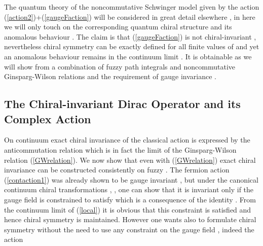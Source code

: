 \documentclass[a4paper,10pt]{article}
\begin{document}
The quantum theory of the noncommutative Schwinger model given by
the action (\ref{action2})+(\ref{gaugeFaction}) will be
considered in great detail elsewhere \cite{badis} , in here we
will only touch on the corresponding quantum chiral structure and
its anomalous behaviour . The claim is that (\ref{gaugeFaction})
is not chiral-invariant , nevertheless chiral symmetry can be
exactly defined for all finite values of \coordHE{} and yet an anomalous
behaviour remains in the continuum limit . It is obtainable as we
will show from a combination of fuzzy path integrals and
noncommutative Ginsparg-Wilson relations and the requirement of
gauge invariance .



\subsection{The Chiral-invariant Dirac Operator \coordHE{} and its Complex Action}
On continuum \coordHE{} exact chiral invariance of the classical
action is expressed by the anticommutation relation
\coordHE{} which is in fact the limit
of the Ginsparg-Wilson relation (\ref{GWrelation}). We now show
that even with (\ref{GWrelation}) exact chiral invariance can be
constructed consistently on fuzzy \coordHE{}. The fermion action
(\ref{contaction1}) was already shown to be gauge invariant , but
under the canonical continuum chiral transformations
\coordHE{}
, \coordHE{}
, one can show that it is invariant only if the gauge field is
constrained to satisfy \coordHE{} which is a consequence of the
identity \coordHE{}. From the continuum limit of (\ref{local}) it is
obvious that this constraint is satisfied and hence chiral
symmetry is maintained. However one wants also to formulate
chiral symmetry without the need to use any constraint on the
gauge field , indeed the action
\end{document}
